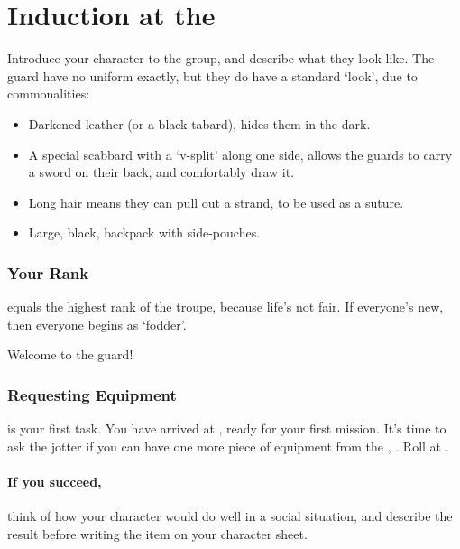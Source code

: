 \section[Induction at the \Glsfmttext{templeOfBeasts}]{Induction at the }
\label{ngIntroductions}

\begin{multicols}{2}

\noindent
Introduce your character to the group, and describe what they look like.
The \gls{guard} have no uniform exactly, but they do have a standard `look', due to commonalities:

\begin{itemize}
  \item
  Darkened leather (or a black tabard), hides them in the dark.
  \item
  A special scabbard with a `v-split' along one side, allows the \glspl{guard} to carry a sword on their back, and comfortably draw it.
  \item
  Long hair means they can pull out a strand, to be used as a suture.
  \item
  Large, black, backpack with side-pouches.
\end{itemize}

\subsubsection{Your Rank}
\label{ngRank}
equals the highest rank of the troupe, because life's not fair.
If everyone's new, then everyone begins as `fodder'.

Welcome to the \gls{guard}!

\subsubsection{Requesting Equipment}
is your first task.
You have arrived at , ready for your first mission.
It's time to ask the \gls{jotter} if you can have one more piece of equipment from the , .
Roll  at \tn[7].

\paragraph{If you succeed,}
think of how your character would do well in a social situation, and describe the result before writing the item on your character sheet.


\end{multicols}
